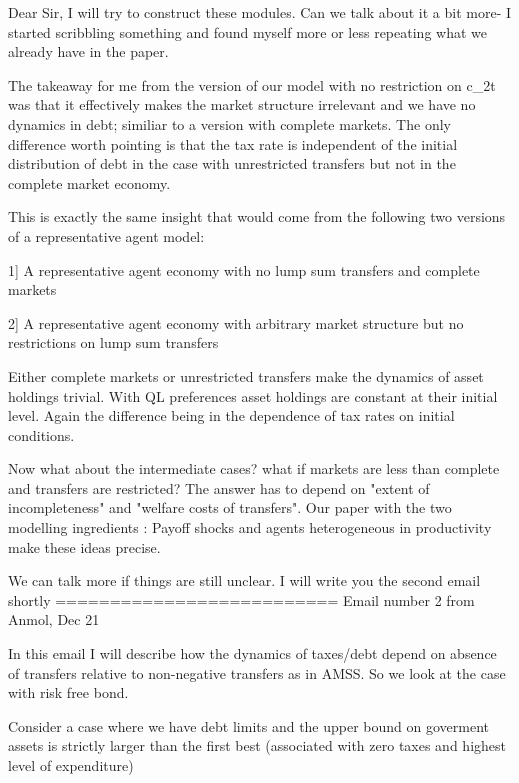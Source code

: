 
Dear Sir,
I will try to construct these modules. Can we talk about it a bit more- I started scribbling something and found myself more or less repeating what we already have in the paper.

The takeaway for me from the version of our model with no restriction on c_2t was that it effectively makes the market structure irrelevant and we have no dynamics in debt; similiar to a version with complete markets. The only difference worth pointing is that the tax rate is independent of the initial distribution of debt in the case with unrestricted transfers but not in the complete market economy.

This is exactly the same insight that would come from the following two versions of  a representative agent model:

1] A representative agent economy with no lump sum transfers and complete markets

2] A representative agent economy with arbitrary market structure but no restrictions on lump sum transfers

Either complete markets or unrestricted transfers make the dynamics of asset holdings trivial. With QL preferences asset holdings are constant at their initial level.  Again the difference being in the dependence of tax rates on initial conditions.


Now what about the intermediate cases? what if markets are less than complete and transfers are restricted? The answer has to depend on "extent of incompleteness" and "welfare costs of transfers". Our paper  with the two modelling ingredients : Payoff shocks and  agents heterogeneous in productivity make these ideas precise.




We can talk more if things are still unclear. I will write you the second email shortly
==========================
Email number 2 from Anmol, Dec 21

In this email I will describe how the dynamics of taxes/debt depend on absence of transfers relative to non-negative transfers as in AMSS. So we look at the case with risk free bond.

Consider a case where we have debt limits and the upper bound on goverment assets is strictly larger than the first best (associated with zero taxes and highest level of expenditure)

